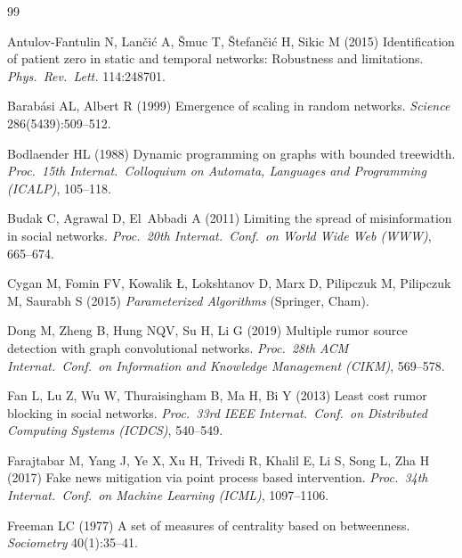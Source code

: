 \documentclass[ijoc,sglanonrev]{informs4}
\begin{document}
\begin{thebibliography}{99}
\providecommand{\natexlab}[1]{#1}
\providecommand{\url}[1]{\texttt{#1}}
\providecommand{\urlprefix}{URL }

Antulov-Fantulin N, Lan\v{c}i\'c A, \v{S}muc T, \v{S}tefan\v{c}i\'c H,
  Sikic M (2015) Identification of patient zero in static and temporal
  networks: Robustness and limitations. \emph{Phys.\ Rev.\ Lett.}
  114:248701.

Barab\'asi AL, Albert R (1999) Emergence of scaling in random networks.
  \emph{Science} 286(5439):509--512.

Bodlaender HL (1988) Dynamic programming on graphs with bounded treewidth.
  \emph{Proc.\ 15th Internat.\ Colloquium on Automata, Languages and
  Programming (ICALP)}, 105--118.

Budak C, Agrawal D, El~Abbadi A (2011) Limiting the spread of misinformation
  in social networks. \emph{Proc.\ 20th Internat.\ Conf.\ on World Wide Web
  (WWW)}, 665--674.

Cygan M, Fomin FV, Kowalik {\L}, Lokshtanov D, Marx D, Pilipczuk M,
  Pilipczuk M, Saurabh S (2015) \emph{Parameterized Algorithms} (Springer,
  Cham).

Dong M, Zheng B, Hung NQV, Su H, Li G (2019) Multiple rumor source detection
  with graph convolutional networks. \emph{Proc.\ 28th ACM Internat.\
  Conf.\ on Information and Knowledge Management (CIKM)}, 569--578.

Fan L, Lu Z, Wu W, Thuraisingham B, Ma H, Bi Y (2013) Least cost rumor
  blocking in social networks. \emph{Proc.\ 33rd IEEE Internat.\ Conf.\ on
  Distributed Computing Systems (ICDCS)}, 540--549.

Farajtabar M, Yang J, Ye X, Xu H, Trivedi R, Khalil E, Li S, Song L, Zha H
  (2017) Fake news mitigation via point process based intervention.
  \emph{Proc.\ 34th Internat.\ Conf.\ on Machine Learning (ICML)},
  1097--1106.

Freeman LC (1977) A set of measures of centrality based on betweenness.
  \emph{Sociometry} 40(1):35--41.


\end{thebibliography}
\end{document}
